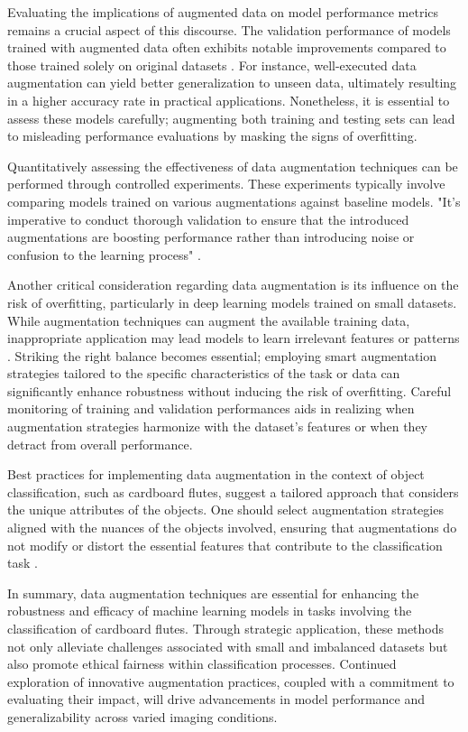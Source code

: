 Evaluating the implications of augmented data on model performance metrics remains a crucial aspect of this discourse. The validation performance of models trained with augmented data often exhibits notable improvements compared to those trained solely on original datasets \cite{inoue2018pairing}. For instance, well-executed data augmentation can yield better generalization to unseen data, ultimately resulting in a higher accuracy rate in practical applications. Nonetheless, it is essential to assess these models carefully; augmenting both training and testing sets can lead to misleading performance evaluations by masking the signs of overfitting.


Quantitatively assessing the effectiveness of data augmentation techniques can be performed through controlled experiments. These experiments typically involve comparing models trained on various augmentations against baseline models. "It's imperative to conduct thorough validation to ensure that the introduced augmentations are boosting performance rather than introducing noise or confusion to the learning process" \cite{wong2016warp}.


Another critical consideration regarding data augmentation is its influence on the risk of overfitting, particularly in deep learning models trained on small datasets. While augmentation techniques can augment the available training data, inappropriate application may lead models to learn irrelevant features or patterns \cite{perez2017augmentation}. Striking the right balance becomes essential; employing smart augmentation strategies tailored to the specific characteristics of the task or data can significantly enhance robustness without inducing the risk of overfitting. Careful monitoring of training and validation performances aids in realizing when augmentation strategies harmonize with the dataset's features or when they detract from overall performance.


Best practices for implementing data augmentation in the context of object classification, such as cardboard flutes, suggest a tailored approach that considers the unique attributes of the objects. One should select augmentation strategies aligned with the nuances of the objects involved, ensuring that augmentations do not modify or distort the essential features that contribute to the classification task \cite{zhao2020augmentation}.


In summary, data augmentation techniques are essential for enhancing the robustness and efficacy of machine learning models in tasks involving the classification of cardboard flutes. Through strategic application, these methods not only alleviate challenges associated with small and imbalanced datasets but also promote ethical fairness within classification processes. Continued exploration of innovative augmentation practices, coupled with a commitment to evaluating their impact, will drive advancements in model performance and generalizability across varied imaging conditions.

